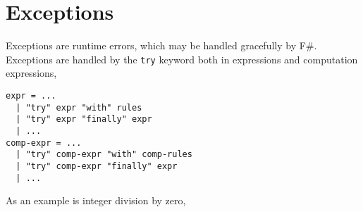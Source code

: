 \chapter{Exceptions}
\label{chap:exceptions}
Exceptions are runtime errors, which may be handled gracefully by F\#. Exceptions are handled by the \lstinline!try! keyword both in expressions and computation expressions,
\begin{lstlisting}[language=ebnf]
expr = ... 
  | "try" expr "with" rules
  | "try" expr "finally" expr
  | ...
comp-expr = ...
  | "try" comp-expr "with" comp-rules
  | "try" comp-expr "finally" expr
  | ...
\end{lstlisting}
As an example is integer division by zero,
%
%

%
%



